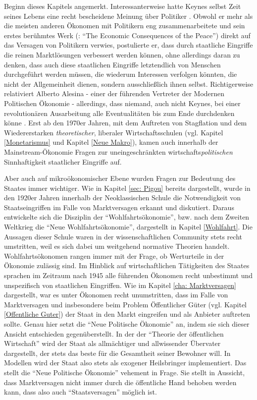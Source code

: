 Beginn dieses Kapitels angemerkt. Interessanterweise hatte Keynes selbst Zeit seines Lebens eine recht bescheidene Meinung über Politiker \parencite[S. 519]{Snowdon2005}. Obwohl er mehr als die meisten anderen Ökonomen mit Politikern eng zusammenarbeitete und sein erstes berühmtes Werk (\textcite{Keynes1919}: "`The Economic Consequences of the Peace"') direkt auf das Versagen von Politikern verwies, postulierte er, dass durch staatliche Eingriffe die reinen Marktlösungen verbessert werden können, ohne allerdings daran zu denken, dass auch diese staatlichen Eingriffe letztendlich von Menschen durchgeführt werden müssen, die wiederum Interessen verfolgen könnten, die nicht der Allgemeinheit dienen, sondern ausschließlich ihnen selbst. Richtigerweise relativiert Alberto Alesina - einer der führenden Vertreter der Modernen Politischen Ökonomie - allerdings, dass niemand, auch nicht Keynes, bei einer revolutionären Ausarbeitung alle Eventualitäten bis zum Ende durchdenken könne \parencite[S. 569]{Snowdon2005}. Erst ab den 1970er Jahren, mit dem Auftreten von Stagflation und dem Wiedererstarken \textit{theoretischer}, liberaler Wirtschaftsschulen (vgl. Kapitel \ref{Monetarismus} und Kapitel \ref{Neue Makro}), kamen auch innerhalb der Mainstream-Ökonomie Fragen zur uneingeschränkten wirtschafts\textit{politischen} Sinnhaftigkeit staatlicher Eingriffe auf. 

Aber auch auf mikroökonomischer Ebene wurden Fragen zur Bedeutung des Staates immer wichtiger. Wie in Kapitel \ref{sec: Pigou} bereits dargestellt, wurde in den 1920er Jahren innerhalb der Neoklassischen Schule die Notwendigkeit von Staatseingriffen im Falle von Marktversagen erkannt und diskutiert. Daraus entwickelte sich die Disziplin der "`Wohlfahrtsökonomie"', bzw. nach dem Zweiten Weltkrieg die "`Neue Wohlfahrtsökonomie"', dargestellt in Kapitel \ref{Wohlfahrt}. Die Aussagen dieser Schule waren in der wissenschaftlichen Community stets recht umstritten, weil es sich dabei um weitgehend normative Theorien handelt. Wohlfahrtsökonomen rangen immer mit der Frage, ob Werturteile in der Ökonomie zulässig sind. Im Hinblick auf wirtschaftlichen Tätigkeiten des Staates sprachen im Zeitraum nach 1945 alle führenden Ökonomen recht unbestimmt und unspezifisch von staatlichen Eingriffen. Wie im Kapitel \ref{cha: Marktversagen} dargestellt, war es unter Ökonomen recht unumstritten, dass im Falle von Marktversagen und insbesondere beim Problem Öffentlicher Güter (vgl. Kapitel \ref{Offentliche Guter}) der Staat in den Markt eingreifen und als Anbieter auftreten sollte. Genau hier setzt die "`Neue Politische Ökonomie"' an, indem sie sich dieser Ansicht entschieden gegenüberstellt. In der der "`Theorie der öffentlichen Wirtschaft"' wird der Staat als allmächtiger und allwissender Übervater dargestellt, der stets das beste für die Gesamtheit seiner Bewohner will. In Modellen wird der Staat also stets als exogener Heilsbringer implementiert. Das stellt die "`Neue Politische Ökonomie"' vehement in Frage. Sie stellt in Aussicht, dass Marktversagen nicht immer durch die öffentliche Hand behoben werden kann, dass also auch "`Staatsversagen"' möglich ist.

